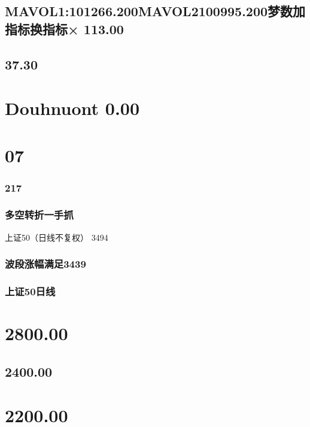 \documentclass{article}
\begin{document}
\subsection{MAVOL1:101266.200MAVOL2100995.200梦数加指标换指标× 113.00}

\subsection{37.30}

\section{Douhnuont 0.00}

\section{07}

\subsubsection{217}

\clearpage

\subsubsection{多空转折一手抓}

上证50（日线不复权） 3494

\subsubsection{波段涨幅满足3439}

\subsubsection{上证50日线}

\section{2800.00}

\subsection{2400.00}

\section{2200.00}
\end{document}
